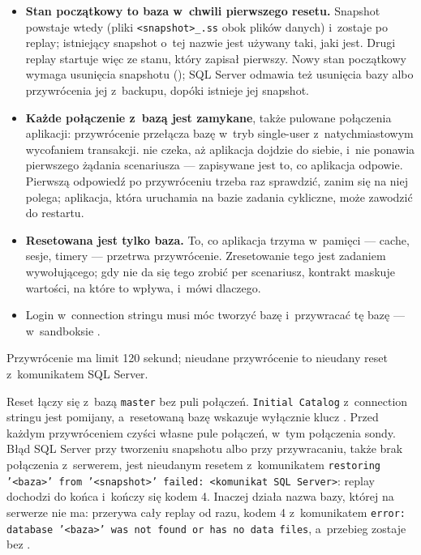 \begin{itemize}
  \item \textbf{Stan początkowy to baza w~chwili pierwszego resetu.} Snapshot powstaje
        wtedy (pliki \texttt{<snapshot>\_<nazwa logiczna>.ss} obok plików danych) i~zostaje
        po replay; istniejący snapshot o~tej nazwie jest używany taki, jaki jest. Drugi
        replay startuje więc ze stanu, który zapisał pierwszy. Nowy stan początkowy wymaga
        usunięcia snapshotu (); SQL Server odmawia też
        usunięcia bazy albo przywrócenia jej z~backupu, dopóki istnieje jej snapshot.
  \item \textbf{Każde połączenie z~bazą jest zamykane}, także pulowane połączenia aplikacji:
        przywrócenie przełącza bazę w~tryb single-user z~natychmiastowym wycofaniem
        transakcji.  nie czeka, aż aplikacja dojdzie do siebie, i~nie ponawia
        pierwszego żądania scenariusza --- zapisywane jest to, co aplikacja odpowie. Pierwszą
        odpowiedź po przywróceniu trzeba raz sprawdzić, zanim się na niej polega; aplikacja,
        która uruchamia na bazie zadania cykliczne, może zawodzić do restartu.
  \item \textbf{Resetowana jest tylko baza.} To, co aplikacja trzyma w~pamięci --- cache,
        sesje, timery --- przetrwa przywrócenie. Zresetowanie tego jest zadaniem
        wywołującego; gdy nie da się tego zrobić per scenariusz, kontrakt maskuje wartości,
        na które to wpływa, i~mówi dlaczego.
  \item Login w~connection stringu musi móc tworzyć bazę i~przywracać tę bazę --- w~sandboksie .
\end{itemize}

Przywrócenie ma limit 120 sekund; nieudane przywrócenie to nieudany reset z~komunikatem SQL
Server.

Reset łączy się z~bazą \texttt{master} bez puli połączeń. \texttt{Initial Catalog}
z~connection stringu jest pomijany, a~resetowaną bazę wskazuje wyłącznie klucz
. Przed każdym przywróceniem  czyści własne pule
połączeń, w~tym połączenia sondy. Błąd SQL Server przy tworzeniu snapshotu albo przy
przywracaniu, także brak połączenia z~serwerem, jest nieudanym resetem z~komunikatem
\texttt{restoring '<baza>' from '<snapshot>' failed: <komunikat SQL Server>}: replay
dochodzi do końca i~kończy się kodem 4. Inaczej działa nazwa bazy, której na serwerze nie
ma: przerywa cały replay od razu, kodem 4 z~komunikatem \texttt{error: database '<baza>'
was not found or has no data files}, a~przebieg zostaje bez .

